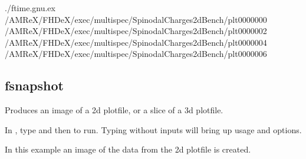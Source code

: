 \documentclass[letterpaper,10pt,english]{sphinxmanual}
\begin{document}
\begin{sphinxVerbatim}[commandchars=\\\{\}]
./ftime.gnu.ex 
\PYGZti{}/AMReX/FHDeX/exec/multispec/Spinodal\PYGZus{}Charges\PYGZus{}2d\PYGZus{}Bench/plt0000000 
\PYGZti{}/AMReX/FHDeX/exec/multispec/Spinodal\PYGZus{}Charges\PYGZus{}2d\PYGZus{}Bench/plt0000002 
\PYGZti{}/AMReX/FHDeX/exec/multispec/Spinodal\PYGZus{}Charges\PYGZus{}2d\PYGZus{}Bench/plt0000004 
\PYGZti{}/AMReX/FHDeX/exec/multispec/Spinodal\PYGZus{}Charges\PYGZus{}2d\PYGZus{}Bench/plt0000006

\end{sphinxVerbatim}

\begin{DUlineblock}{0em}
\item[] 
\end{DUlineblock}


\subsection{fsnapshot}
\label{\detokenize{Post_Processing:fsnapshot}}
\sphinxAtStartPar
Produces an image of a 2\sphinxhyphen{}d plotfile, or a slice of a 3\sphinxhyphen{}d plotfile.

\sphinxAtStartPar
{}

\sphinxAtStartPar
In , type  and then  to run.
Typing  without inputs will bring up usage and options.

\sphinxAtStartPar
{}

\sphinxAtStartPar
In this example an image of the data from the 2\sphinxhyphen{}d plotfile  is created.
\end{document}

